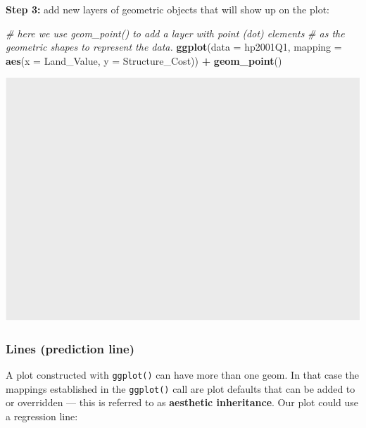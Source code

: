 \documentclass[
]{book}
\newenvironment{Shaded}{\begin{snugshade}}{\end{snugshade}}
\newcommand{\CommentTok}[1]{\textcolor[rgb]{0.56,0.35,0.01}{\textit{#1}}}
\newcommand{\DataTypeTok}[1]{\textcolor[rgb]{0.13,0.29,0.53}{#1}}
\newcommand{\KeywordTok}[1]{\textcolor[rgb]{0.13,0.29,0.53}{\textbf{#1}}}
\newcommand{\NormalTok}[1]{#1}
\newcommand{\OperatorTok}[1]{\textcolor[rgb]{0.81,0.36,0.00}{\textbf{#1}}}
\newcommand{\StringTok}[1]{\textcolor[rgb]{0.31,0.60,0.02}{#1}}
\begin{document}
\textbf{Step 3:} add new layers of geometric objects that will show up on the plot:

\begin{Shaded}
\begin{Highlighting}[]
\CommentTok{\# here we use geom\_point() to add a layer with point (dot) elements }
\CommentTok{\# as the geometric shapes to represent the data.}
\KeywordTok{ggplot}\NormalTok{(}\DataTypeTok{data =}\NormalTok{ hp2001Q1, }\DataTypeTok{mapping =} \KeywordTok{aes}\NormalTok{(}\DataTypeTok{x =}\NormalTok{ Land\_Value, }\DataTypeTok{y =}\NormalTok{ Structure\_Cost)) }\OperatorTok{+}
\StringTok{  }\KeywordTok{geom\_point}\NormalTok{()}
\end{Highlighting}
\end{Shaded}

\includegraphics{R/Rgraphics/figures/unnamed-chunk-145-1.pdf}

\hypertarget{lines-prediction-line}{%
\subsubsection{Lines (prediction line)}\label{lines-prediction-line}}

A plot constructed with \texttt{ggplot()} can have more than one geom. In that case the mappings established in the \texttt{ggplot()} call are plot defaults that can be added to or overridden --- this is referred to as \textbf{aesthetic inheritance}. Our plot could use a regression line:
\end{document}
